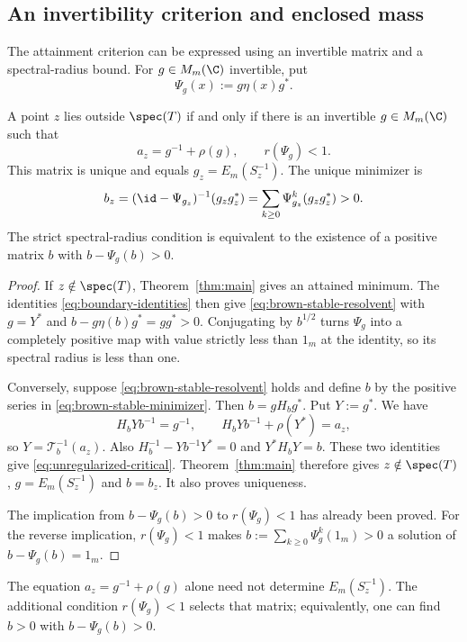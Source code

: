 \subsection{An invertibility criterion and enclosed mass}
The attainment criterion can be expressed using an invertible matrix and a spectral-radius bound.
For $g\in M_m(\C)$ invertible, put
\[
 \Psi_g(x):=g\eta(x)g^*.
\]
\begin{proposition}\label{prop:brown-stable-resolvent}
A point $z$ lies outside $\spec(T)$ if and only if there is an invertible $g\in M_m(\C)$ such that
\begin{equation}\label{eq:brown-stable-resolvent}
 a_z=g^{-1}+\rho(g),\qquad r(\Psi_g)<1.
\end{equation}
This matrix is unique and equals $g_z=E_m(S_z^{-1})$.
The unique minimizer is
\begin{equation}\label{eq:brown-stable-minimizer}
 b_z=(\id-\Psi_{g_z})^{-1}(g_zg_z^*)
     =\sum_{k\ge0}\Psi_{g_z}^k(g_zg_z^*)>0.
\end{equation}
The strict spectral-radius condition is equivalent to the existence of a positive matrix $b$ with $b-\Psi_g(b)>0$.
\end{proposition}
\begin{proof}
If $z\notin\spec(T)$, Theorem~\ref{thm:main} gives an attained minimum.
The identities \eqref{eq:boundary-identities} then give \eqref{eq:brown-stable-resolvent} with $g=Y^*$ and $b-g\eta(b)g^*=gg^*>0$.
Conjugating by $b^{1/2}$ turns $\Psi_g$ into a completely positive map with value strictly less than $1_m$ at the identity, so its spectral radius is less than one.

Conversely, suppose \eqref{eq:brown-stable-resolvent} holds and define $b$ by the positive series in \eqref{eq:brown-stable-minimizer}.
Then $b=gH_bg^*$.
Put $Y:=g^*$.
We have
\[
 H_bYb^{-1}=g^{-1},\qquad
 H_bYb^{-1}+\rho(Y^*)=a_z,
\]
so $Y=\mathcal T_b^{-1}(a_z)$.
Also $H_b^{-1}-Yb^{-1}Y^*=0$ and $Y^*H_bY=b$.
These two identities give \eqref{eq:unregularized-critical}.
Theorem~\ref{thm:main} therefore gives $z\notin\spec(T)$, $g=E_m(S_z^{-1})$ and $b=b_z$.
It also proves uniqueness.

The implication from $b-\Psi_g(b)>0$ to $r(\Psi_g)<1$ has already been proved.
For the reverse implication, $r(\Psi_g)<1$ makes $b:=\sum_{k\ge0}\Psi_g^k(1_m)>0$ a solution of $b-\Psi_g(b)=1_m$.
\end{proof}

The equation $a_z=g^{-1}+\rho(g)$ alone need not determine $E_m(S_z^{-1})$.
The additional condition $r(\Psi_g)<1$ selects that matrix; equivalently, one can find $b>0$ with $b-\Psi_g(b)>0$.

